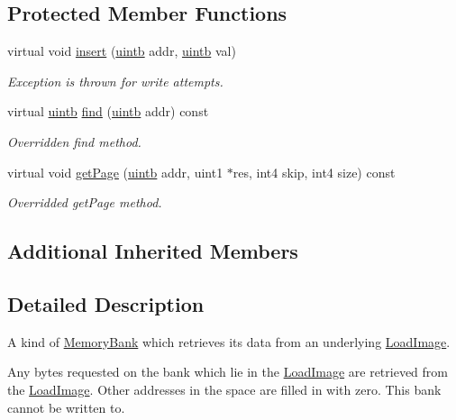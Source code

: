\subsection*{Protected Member Functions}
\begin{DoxyCompactItemize}
\item 
virtual void \mbox{\hyperlink{class_memory_image_a8bf36a4938f306fedbd4d409406cc102}{insert}} (\mbox{\hyperlink{types_8h_a2db313c5d32a12b01d26ac9b3bca178f}{uintb}} addr, \mbox{\hyperlink{types_8h_a2db313c5d32a12b01d26ac9b3bca178f}{uintb}} val)
\begin{DoxyCompactList}\small\item\em Exception is thrown for write attempts. \end{DoxyCompactList}\item 
virtual \mbox{\hyperlink{types_8h_a2db313c5d32a12b01d26ac9b3bca178f}{uintb}} \mbox{\hyperlink{class_memory_image_a196464ef9a11a0088aa62d01e510aabf}{find}} (\mbox{\hyperlink{types_8h_a2db313c5d32a12b01d26ac9b3bca178f}{uintb}} addr) const
\begin{DoxyCompactList}\small\item\em Overridden find method. \end{DoxyCompactList}\item 
virtual void \mbox{\hyperlink{class_memory_image_abcf3229adb6b824702b627d1de5a9f10}{get\+Page}} (\mbox{\hyperlink{types_8h_a2db313c5d32a12b01d26ac9b3bca178f}{uintb}} addr, uint1 $\ast$res, int4 skip, int4 size) const
\begin{DoxyCompactList}\small\item\em Overridded get\+Page method. \end{DoxyCompactList}\end{DoxyCompactItemize}
\subsection*{Additional Inherited Members}


\subsection{Detailed Description}
A kind of \mbox{\hyperlink{class_memory_bank}{Memory\+Bank}} which retrieves its data from an underlying \mbox{\hyperlink{class_load_image}{Load\+Image}}. 

Any bytes requested on the bank which lie in the \mbox{\hyperlink{class_load_image}{Load\+Image}} are retrieved from the \mbox{\hyperlink{class_load_image}{Load\+Image}}. Other addresses in the space are filled in with zero. This bank cannot be written to. 

